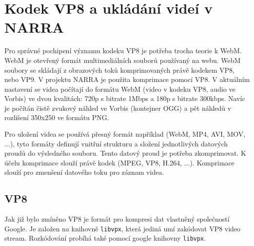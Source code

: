 \section {Kodek VP8 a ukládání videí v NARRA}
\par Pro správné pochipení významu kodeku VP8 je potřeba trocha teorie k WebM. WebM je otevřený formát multimediálních souborů používaný na webu. WebM soubory se skládají z obrazových toků komprimovaných právě kodekem VP8, nebo VP9. V projektu NARRA je použita komprimace pomocí VP8. V aktuálním nastavení se videa počítají do formátu WebM (video v kodeku VP8, audio ve Vorbis) ve dvou kvalitách: 720p s bitrate 1Mbps a 180p s bitrate 300kbps. Navíc je počítán čistě zvukový náhled ve Vorbis (kontejner OGG) a pět náhledů v rozlišení 350x250 ve formátu PNG. 
\par Pro uložení videa se používá přesný formát například (WebM, MP4, AVI, MOV, ...), tyto formáty definují vnitřní strukturu a složení jednotlivých datových proudů do výsledného souboru. Tento datový proud je potřeba zkomprimovat. K účelu komprimace slouží právě kodek (MPEG, VP8, H.264, ...). Komprimace slouží pro zmenšení datového toku pro záznam videa.
\subsection{VP8}
\par Jak již bylo zmíněno VP8 je formát pro kompresi dat vlastněný společností Google. Je založen na knihovně \texttt{libvpx}, která jediná umí zakódovat VP8 video stream. Rozkódování probíhá také pomocí google knihovny \texttt{libvpx}.


